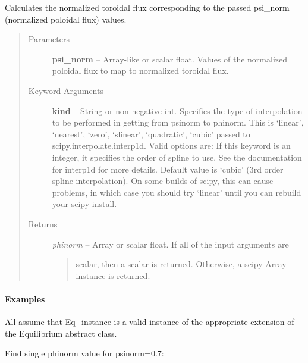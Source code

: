 \documentclass[letterpaper,10pt,english]{sphinxmanual}
\begin{document}
\begin{fulllineitems}
\begin{fulllineitems}
\end{fulllineitems}


\begin{fulllineitems}
\label{eqtools:eqtools.eqdskreader.EqdskReader.psinorm2phinorm}
Calculates the normalized toroidal flux corresponding to the passed psi\_norm (normalized poloidal flux) values.
\begin{quote}\begin{description}
\item[{Parameters }] \leavevmode
\textbf{psi\_norm} --
Array-like or scalar float.
Values of the normalized
poloidal flux to map to normalized toroidal flux.

\item[{Keyword Arguments}] \leavevmode
\textbf{kind} --
String or non-negative int.
Specifies the type of interpolation
to be performed in getting from psinorm to phinorm. This is
`linear', `nearest', `zero', `slinear', `quadratic', `cubic'
passed to scipy.interpolate.interp1d. Valid options are:
If this keyword is an integer, it specifies the order of spline
to use. See the documentation for interp1d for more details.
Default value is `cubic' (3rd order spline interpolation). On
some builds of scipy, this can cause problems, in which case
you should try `linear' until you can rebuild your scipy install.

\item[{Returns}] \leavevmode

\emph{phinorm} --
Array or scalar float. If all of the input arguments are
\begin{quote}

scalar, then a scalar is returned. Otherwise, a scipy Array
instance is returned.
\end{quote}


\end{description}\end{quote}
\paragraph{Examples}

All assume that Eq\_instance is a valid instance of the appropriate
extension of the Equilibrium abstract class.

Find single phinorm value for psinorm=0.7:


\end{fulllineitems}
\end{fulllineitems}
\end{document}
